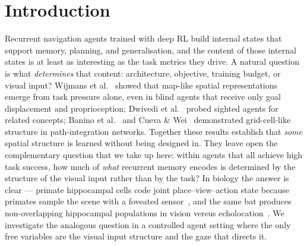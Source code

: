 \documentclass{article}
\begin{document}
\section{Introduction}

Recurrent navigation agents trained with deep RL build internal states that support memory, planning, and generalisation, and the content of those internal states is at least as interesting as the task metrics they drive. A natural question is what \emph{determines} that content: architecture, objective, training budget, or visual input? Wijmans et al.~\citep{wijmans2023emergence} showed that map-like spatial representations emerge from task pressure alone, even in blind agents that receive only goal displacement and proprioception; Dwivedi et al.~\citep{dwivedi2022isee} probed sighted agents for related concepts; Banino et al.~\citep{banino2018grid} and Cueva \& Wei~\citep{cueva2018grid} demonstrated grid-cell-like structure in path-integration networks. Together these results establish that \emph{some} spatial structure is learned without being designed in. They leave open the complementary question that we take up here: within agents that all achieve high task success, how much of \emph{what} recurrent memory encodes is determined by the structure of the visual input rather than by the task? In biology the answer is clear --- primate hippocampal cells code joint place--view--action state because primates sample the scene with a foveated sensor~\citep{wirth2017gaze,rolls2024why}, and the same bat produces non-overlapping hippocampal populations in vision versus echolocation~\citep{geva2016remapping}. We investigate the analogous question in a controlled agent setting where the only free variables are the visual input structure and the gaze that directs it.
\end{document}
